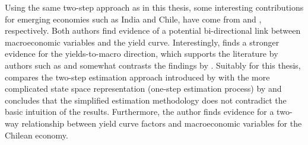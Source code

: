 Using the same two-step approach as in this thesis, some interesting contributions for emerging economies such as India and Chile, have come from \citet{kanjilal2011macroeconomic} and \citet{morales2010real}, respectively. 
Both authors find evidence of a potential bi-directional link between macroeconomic variables and the yield curve. 
Interestingly, \citet{kanjilal2011macroeconomic} finds a stronger evidence for the yields-to-macro direction, which supports the literature by authors such as \citet{estrella1991term} and somewhat contrasts the findings by \citet{diebold2006macroeconomy}. 
Suitably for this thesis, \citet{morales2010real} compares the two-step estimation approach introduced by \citet{diebold2006forecasting} with the more complicated state space representation (one-step estimation process) by \citet{diebold2006macroeconomy} and concludes that the simplified estimation methodology does not contradict the basic intuition of the results. Furthermore, the author finds evidence for a two-way relationship between yield curve factors and macroeconomic variables for the Chilean economy. 


